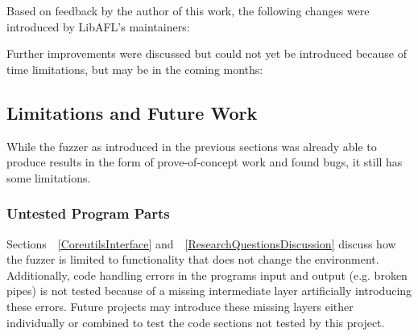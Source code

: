\documentclass{article}
\newcommand{\code}[2][]{\lstinline[language=#1, breaklines=false, basicstyle=\ttfamily\normalsize]{#2}}
\let\savedRef=\ref
\renewcommand{\ref}{\unskip~\savedRef}
\begin{document}
\begin{multicols}{2}
    Based on feedback by the author of this work, the following changes were introduced by LibAFL's maintainers:


    Further improvements were discussed but could not yet be introduced because of time limitations, but may be in the coming months:


    \subsection{Limitations and Future Work}

    While the fuzzer as introduced in the previous sections was already able to produce results in the form of prove-of-concept work and found bugs, it still has some limitations.

    \subsubsection{Untested Program Parts}
    Sections~\ref{CoreutilsInterface} and~\ref{ResearchQuestionsDiscussion} discuss how the fuzzer is limited to functionality that does not change the environment. Additionally, code handling errors in the programs input and output (e.g. broken pipes) is not tested because of a missing intermediate layer artificially introducing these errors. Future projects may introduce these missing layers either individually or combined to test the code sections not tested by this project.


\end{multicols}
\end{document}
